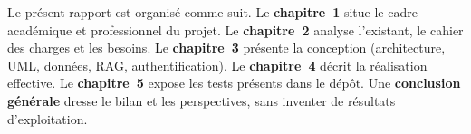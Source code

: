 Le présent rapport est organisé comme suit. Le \textbf{chapitre~1} situe le cadre académique et professionnel du projet. Le \textbf{chapitre~2} analyse l'existant, le cahier des charges et les besoins. Le \textbf{chapitre~3} présente la conception (architecture, UML, données, RAG, authentification). Le \textbf{chapitre~4} décrit la réalisation effective. Le \textbf{chapitre~5} expose les tests présents dans le dépôt. Une \textbf{conclusion générale} dresse le bilan et les perspectives, sans inventer de résultats d'exploitation.
